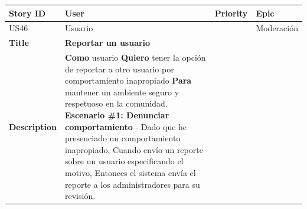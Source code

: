 {\def\LTcaptype{none} %
\begin{longtable}[]{@{}
  >{\raggedright\arraybackslash}p{}
  >{\raggedright\arraybackslash}p{}
  >{\raggedright\arraybackslash}p{}
  >{\raggedright\arraybackslash}p{}@{}}
\toprule\noalign{}
\begin{minipage}[b]{\linewidth}\raggedright
Story ID
\end{minipage} & \begin{minipage}[b]{\linewidth}\raggedright
User
\end{minipage} & \begin{minipage}[b]{\linewidth}\raggedright
Priority
\end{minipage} & \begin{minipage}[b]{\linewidth}\raggedright
Epic
\end{minipage} \\
\midrule\noalign{}
\endhead
\bottomrule\noalign{}
\endlastfoot
US46 & Usuario & 5 & Moderación \\
\textbf{Title} & \textbf{Reportar un usuario} & & \\
\textbf{Description} & \textbf{Como} usuario \textbf{Quiero} tener la
opción de reportar a otro usuario por comportamiento inapropiado
\textbf{Para} mantener un ambiente seguro y respetuoso en la comunidad.
\textbf{Escenario \#1: Denunciar comportamiento} - Dado que he
presenciado un comportamiento inapropiado, Cuando envío un reporte sobre
un usuario especificando el motivo, Entonces el sistema envía el reporte
a los administradores para su revisión. & & \\
\end{longtable}
}

